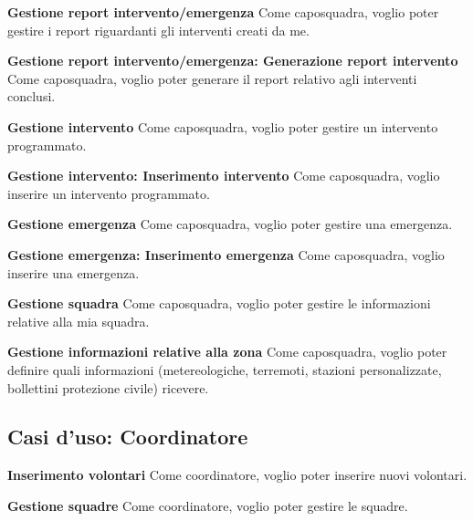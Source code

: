 \textbf{Gestione report intervento/emergenza}
Come caposquadra, voglio poter gestire i report riguardanti gli interventi creati da me.

\textbf{Gestione report intervento/emergenza: Generazione report intervento}
Come caposquadra, voglio poter generare il report relativo agli interventi conclusi.

\textbf{Gestione intervento}
Come caposquadra, voglio poter gestire un intervento programmato.

\textbf{Gestione intervento: Inserimento intervento}
Come caposquadra, voglio inserire un intervento programmato.

\textbf{Gestione emergenza}
Come caposquadra, voglio poter gestire una emergenza.

\textbf{Gestione emergenza: Inserimento emergenza}
Come caposquadra, voglio inserire una emergenza.

\textbf{Gestione squadra}
Come caposquadra, voglio poter gestire le informazioni relative alla mia squadra.

\textbf{Gestione informazioni relative alla zona} 
Come caposquadra, voglio poter definire quali informazioni (metereologiche, terremoti, stazioni personalizzate, bollettini protezione civile) ricevere.


\subsection{Casi d'uso: Coordinatore}


\textbf{Inserimento volontari}
Come coordinatore, voglio poter inserire nuovi volontari.

\textbf{Gestione squadre}
Come coordinatore, voglio poter gestire le squadre.


